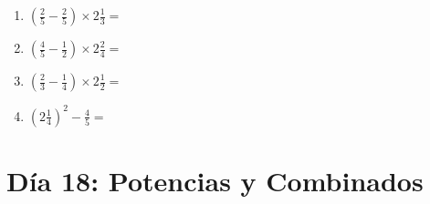 \documentclass[12pt]{article}
\begin{document}
\begin{enumerate}
\item \large $ \left( \frac{2}{5} - \frac{2}{5} \right) \times 2 \frac{1}{3} = $ \vspace{1.6cm}
\item \large $ \left( \frac{4}{5} - \frac{1}{2} \right) \times 2 \frac{2}{4} = $ \vspace{1.6cm}
\item \large $ \left( \frac{2}{3} - \frac{1}{4} \right) \times 2 \frac{1}{2} = $ \vspace{1.6cm}
\item \large $ \left( 2 \frac{1}{4} \right)^2 - \frac{4}{5} = $ \vspace{1.6cm}
\end{enumerate}\newpage
\section*{Día 18: Potencias y Combinados}
\end{document}
